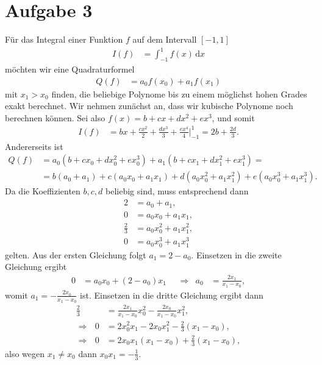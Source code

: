 \documentclass[english, parskip=full]{scrartcl}
\newcommand{\intx}{}
\newcommand{\kla}{}
\begin{document}
\section*{Aufgabe 3}
Für das Integral einer Funktion $f$ auf dem Intervall $[-1,1]$ 
\begin{align}
I(f) &= \intx\int_{-1}^{1} f(x)\, \mathrm{d}x
\end{align}
möchten wir eine Quadraturformel 
\begin{align}
Q(f) &= a_0f(x_0) + a_1 f(x_1)
\end{align}
mit $x_1 > x_0$ finden, die beliebige Polynome bis zu einem möglichst hohen Grades exakt berechnet.
Wir nehmen zunächst an, dass wir kubische Polynome noch berechnen können.
Sei also $f(x) = b+cx+dx^2+ex^3$, und somit
\begin{align}
I(f) &= bx + \frac{cx^2}{2} + \frac{dx^3}{3} + \frac{ex^4}{4} \Big\vert_{-1}^1 = 2b + \frac{2d}{3}.
\end{align}
Andererseits ist
\begin{align}
Q(f) &= a_0 \kla\left( b+cx_0+dx_0^2+ex_0^3 \right) + a_1 \kla\left( b+cx_1+dx_1^2+ex_1^3 \right) = \\
&= b\kla\left( a_0 + a_1 \right) + c \kla\left( a_0x_0 + a_1x_1 \right) + d\kla\left( a_0x_0^2 + a_1x_1^2 \right) + e\kla\left( a_0x_0^3 + a_1x_1^3 \right).
\end{align}
Da die Koeffizienten $b,c,d$ beliebig sind, muss entsprechend dann
\begin{align}
2 &= a_0 + a_1,\\
0 &= a_0x_0 + a_1x_1,\\
\frac{2}{3} &= a_0x_0^2 + a_1x_1^2,\\
0 &= a_0x_0^3 + a_1x_1^3
\end{align}
gelten. 
Aus der ersten Gleichung folgt $a_1 = 2 - a_0$.
Einsetzen in die zweite Gleichung ergibt
\begin{align}
0 &= a_0x_0 + (2-a_0)x_1 && \Rightarrow & a_0 &= \frac{2x_1}{x_1 - x_0},
\end{align}
womit $a_1 = -\frac{2x_0}{x_1 - x_0}$ ist.
Einsetzen in die dritte Gleichung ergibt dann
\begin{align}
\frac{2}{3} &= \frac{2x_1}{x_1 - x_0}x_0^2 - \frac{2x_0}{x_1 - x_0}x_1^2,\\
\Rightarrow\ \ \ 0 &= 2x_0^2x_1 - 2x_0x_1^2  - \frac{2}{3}(x_1-x_0),\\
\Rightarrow\ \ \ 0 &= 2x_0x_1 (x_1 - x_0) + \frac{2}{3}(x_1-x_0),
\end{align} 
also wegen $x_1\neq x_0$ dann $x_0x_1 = -\frac{1}{3}$.
\end{document}
